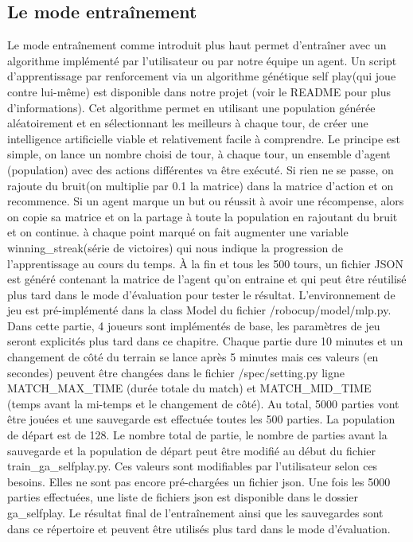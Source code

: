 \documentclass[11pt, a4paper]{article}
\begin{document}
	\subsection{Le mode entraînement}
	Le mode entraînement comme introduit plus haut permet d'entraîner avec un algorithme implémenté par  l'utilisateur ou par notre équipe un agent.
	Un script d'apprentissage par renforcement via un algorithme génétique self play(qui joue contre lui-même) est disponible dans notre projet (voir le README pour plus d'informations). Cet algorithme permet en utilisant une population générée aléatoirement et en sélectionnant les meilleurs à chaque tour, de créer une intelligence artificielle viable et relativement facile à comprendre. Le principe est simple, on lance un nombre choisi de tour, à chaque tour, un ensemble d'agent (population) avec des actions différentes va être exécuté. Si rien ne se passe, on rajoute du bruit(on multiplie par 0.1 la matrice) dans la matrice d'action et on recommence. Si un agent marque un but ou réussit à avoir une récompense, alors on copie sa matrice et on la partage à toute la population en rajoutant du bruit et on  continue. à chaque point marqué on fait augmenter une variable winning\_streak(série de victoires) qui nous indique la progression de l'apprentissage au cours du temps. À la fin et tous les 500 tours, un fichier JSON est généré contenant la matrice de l'agent qu'on entraine et qui peut être réutilisé plus tard dans le mode d'évaluation pour tester le résultat.
	L'environnement de jeu est pré-implémenté dans la class Model du fichier /robocup/model/mlp.py.
	Dans cette partie, 4 joueurs sont implémentés de base, les paramètres de jeu seront explicités plus tard dans ce chapitre.
	Chaque partie dure 10 minutes et un changement de côté du terrain se lance après 5 minutes mais ces valeurs (en secondes) peuvent être changées dans le fichier /spec/setting.py ligne MATCH\_MAX\_TIME (durée totale du match) et MATCH\_MID\_TIME (temps avant la mi-temps et le changement de côté).
	Au total, 5000 parties vont être jouées et une sauvegarde est effectuée toutes les 500 parties.
	La population de départ est de 128.
	Le nombre total de partie, le nombre de parties avant la sauvegarde et la population de départ peut être modifié au début du fichier train\_ga\_selfplay.py.
	Ces valeurs sont modifiables par l'utilisateur selon ces besoins. Elles ne sont pas encore pré-chargées un fichier json.
	Une fois les 5000 parties effectuées, une liste de fichiers json est disponible dans le dossier ga\_selfplay. Le résultat final de l'entraînement ainsi que les sauvegardes sont dans ce répertoire et peuvent être utilisés plus tard dans le mode d'évaluation.
\end{document}
